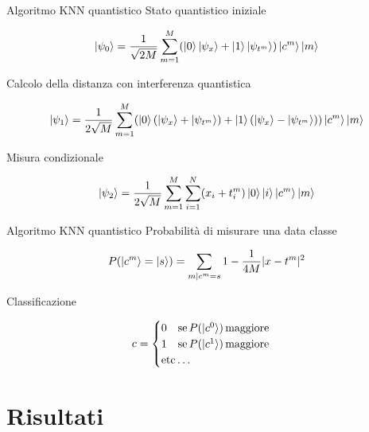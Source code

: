 \documentclass{beamer}
\begin{document}

    \begin{frame}{Algoritmo KNN quantistico}
        Stato quantistico iniziale

		\begin{equation*}
			\ket{\psi_0} = \frac{1}{\sqrt{2M}} \sum_{m=1}^M 
			(\ket{0}\ket{\psi_x}+\ket{1}\ket{\psi_{t^m}})\ket{c^m}\ket{m}
		\end{equation*}

		Calcolo della distanza con interferenza quantistica

		\begin{equation*}
			\ket{\psi_1} = \frac{1}{2\sqrt{M}}\sum_{m=1}^M 
			(\ket{0}(\ket{\psi_x}+\ket{\psi_{t^m}})+\ket{1}(\ket{\psi_x}-\ket{\psi_{t^m}}))\ket{c^m}\ket{m}
		\end{equation*}
	
		Misura condizionale

		\begin{equation*}
			\ket{\psi_2} = \frac{1}{2\sqrt{M}} \sum_{m=1}^M \sum_{i=1}^N
			(x_i+t_i^m)\ket{0}\ket{i}\ket{c^m}\ket{m}
		\end{equation*}
    \end{frame}

    \begin{frame}{Algoritmo KNN quantistico}
        Probabilità di misurare una data classe

		\begin{equation*}
			P(\ket{c^m} = \ket{s}) = \sum_{m|c^m=s} 
			1 - \frac{1}{4M} |x-t^m|^2
		\end{equation*}

		Classificazione

		\begin{equation*}
			c = \begin{cases}
			0 \quad \text{se}\, P(\ket{c^0})\, \text{maggiore} \\
			1 \quad \text{se}\, P(\ket{c^1})\, \text{maggiore} \\
			\text{etc}\ldots
		\end{cases}
		\end{equation*}
    \end{frame}

    \section{Risultati}
\end{document}
